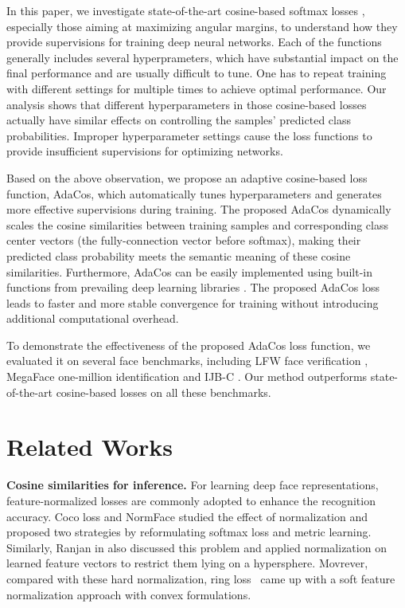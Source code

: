 \documentclass[10pt,twocolumn,letterpaper]{article}
\begin{document}
In this paper, we investigate state-of-the-art cosine-based softmax losses \cite{L2-softmax,CosFace,ArcFace}, especially those aiming at maximizing angular margins, to understand how they provide supervisions for training deep neural networks. Each of the functions generally includes several hyperprameters, which have substantial impact on the final performance and are usually difficult to tune. One has to repeat training with different settings for multiple times to achieve optimal performance. Our analysis shows that different hyperparameters in those cosine-based losses actually have similar effects on controlling the samples' predicted class probabilities. Improper hyperparameter settings cause the loss functions to provide insufficient supervisions for optimizing networks.

Based on the above observation, we propose an adaptive cosine-based loss function, AdaCos, which automatically tunes hyperparameters and generates more effective supervisions during training. 
The proposed AdaCos dynamically scales the cosine similarities between training samples and corresponding class center vectors (the fully-connection vector before softmax), making their predicted class probability meets the semantic meaning of these cosine similarities.
Furthermore, AdaCos can be easily implemented using built-in functions from prevailing deep learning libraries \cite{paszke2017automatic, abadi2016tensorflow,chen2015mxnet,jia2014caffe}. The proposed AdaCos loss leads to faster and more stable convergence for training without introducing additional computational overhead.

To demonstrate the effectiveness of the proposed AdaCos loss function, we evaluated it on several face benchmarks, including LFW face verification \cite{LFW}, MegaFace one-million identification \cite{MegaFace1} and IJB-C \cite{ijbc}. Our method outperforms state-of-the-art cosine-based losses on all these benchmarks.



\section{Related Works}
{\bf Cosine similarities for inference.}
For learning deep face representations, feature-normalized losses are commonly adopted to enhance the recognition accuracy. Coco loss \cite{liu_2017_coco_v1,liu_2017_coco_v2} and NormFace \cite{NormFace} studied the effect of normalization and proposed two strategies by reformulating softmax loss and metric learning. Similarly, Ranjan \etal in \cite{L2-softmax} also discussed this problem and applied normalization on learned feature vectors to restrict them lying on a hypersphere. Movrever, compared with these hard normalization, ring loss~\cite{zheng2018ring} came up with a soft feature normalization approach with convex formulations.
\end{document}
